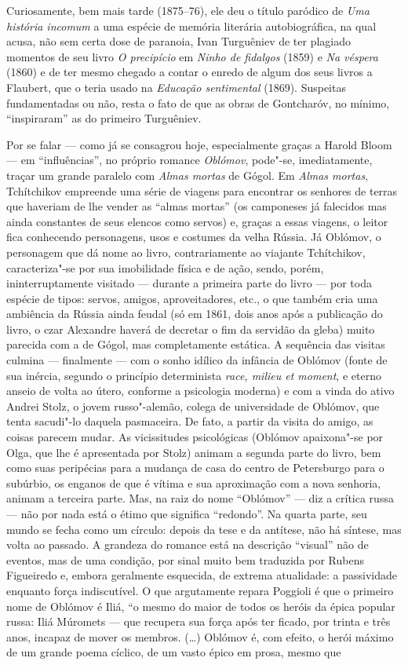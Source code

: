 Curiosamente, bem mais tarde (1875--76), ele deu o título paródico de \emph{Uma história incomum} a uma espécie de memória literária autobiográfica, na qual acusa, não sem certa dose de paranoia, Ivan Turguêniev de ter plagiado momentos de seu livro \emph{O precipício} em \emph{Ninho de fidalgos} (1859) e \emph{Na véspera} (1860) e de ter mesmo chegado a contar o enredo de algum dos seus livros a Flaubert, que o teria usado na \emph{Educação sentimental} (1869). Suspeitas fundamentadas ou não, resta o fato de que as obras de Gontcharóv, no mínimo, ``inspiraram'' as do primeiro Turguêniev.

Por se falar --- como já se consagrou hoje, especialmente graças a Harold Bloom --- em ``influências'', no próprio romance \emph{Oblómov}, pode"-se, imediatamente, traçar um grande paralelo com \emph{Almas mortas} de Gógol. Em \emph{Almas mortas}, Tchítchikov empreende uma série de viagens para encontrar os senhores de terras que haveriam de lhe vender as ``almas mortas'' (os camponeses já falecidos mas ainda constantes de seus elencos como servos) e, graças a essas viagens, o leitor fica conhecendo personagens, usos e costumes da velha Rússia. Já Oblómov, o personagem que dá nome ao livro, contrariamente ao viajante Tchítchikov, caracteriza"-se por sua imobilidade física e de ação, sendo, porém, ininterruptamente visitado --- durante a primeira parte do livro --- por toda espécie de tipos: servos, amigos, aproveitadores, etc., o que também cria uma ambiência da Rússia ainda feudal (só em 1861, dois anos após a publicação do livro, o czar Alexandre  haverá de decretar o fim da servidão da gleba) muito parecida com a de Gógol, mas completamente estática. A sequência das visitas culmina --- finalmente --- com o sonho idílico da infância de Oblómov (fonte de sua inércia, segundo o princípio determinista \emph{race, milieu et moment}, e eterno anseio de volta ao útero, conforme a psicologia moderna) e com a vinda do ativo Andrei Stolz, o jovem russo"-alemão, colega de universidade de Oblómov, que tenta sacudi"-lo daquela pasmaceira. De fato, a partir da visita do amigo, as coisas parecem mudar. As vicissitudes psicológicas (Oblómov apaixona"-se por Olga, que lhe é apresentada por Stolz) animam a segunda parte do livro, bem como suas peripécias para a mudança de casa do centro de Petersburgo para o subúrbio, os enganos de que é vítima e sua aproximação com a nova senhoria, animam a terceira parte. Mas, na raiz do nome ``Oblómov'' --- diz a crítica russa --- não por nada está o étimo que significa ``redondo''. Na quarta parte, seu mundo se fecha como um círculo: depois da tese e da antítese, não há síntese, mas volta ao passado. A grandeza do romance está na descrição ``visual'' não de eventos, mas de uma condição, por sinal muito bem traduzida por Rubens Figueiredo e, embora geralmente esquecida, de extrema atualidade: a passividade enquanto força indiscutível. O que argutamente repara Poggioli é que o primeiro nome de Oblómov é Iliá, ``o mesmo do maior de todos os heróis da épica popular russa: Iliá Múromets --- que recupera sua força após ter ficado, por trinta e três anos, incapaz de mover os membros. (\ldots{}) Oblómov é, com efeito, o herói máximo de um grande poema cíclico, de um vasto épico em prosa, mesmo que 